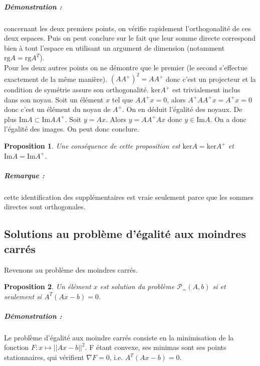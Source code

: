 \documentclass[10pt,a4paper]{article}
\newtheorem{prop}{Proposition}
\begin{document}
\subparagraph{Démonstration :} concernant les deux premiers points, on vérifie rapidement l'orthogonalité de ces deux espaces.
Puis on peut conclure sur le fait que leur somme directe correspond bien à tout l'espace en utilisant un argument de dimension (notamment $\text{rg}A=\text{rg}A^T$).\\
Pour les deux autres points on ne démontre que le premier (le second s'effectue exactement de la même manière). $(AA^+)^2=AA^+$ donc c'est un projecteur et la condition de symétrie assure son orthogonalité. $\text{ker}A^+$ est trivialement inclus dans son noyau.
Soit un élément $x$ tel que $AA^+x=0$, alors $A^+AA^+x=A^+x=0$ donc c'est un élément du noyau de $A^+$.
On en déduit l'égalité des noyaux.
De plus $\text{Im}A \subset \text{Im}AA^+$.
Soit $y=Ax$.
Alors $y=AA^+Ax$ donc $y \in \text{Im}A$.
On a donc l'égalité des images.
On peut donc conclure.
\begin{prop}
Une conséquence de cette proposition est $\text{ker}A=\text{ker}A^+$ et $\text{Im}A=\text{Im}A^+$.
\end{prop}
\subparagraph{Remarque :} cette identification des supplémentaires est vraie seulement parce que les sommes directes sont orthogonales.\\

\subsection{Solutions au problème d'égalité aux moindres carrés}

Revenons au problème des moindres carrés.
\begin{prop}
  Un élément $x$ est solution du problème $\mathcal{P}_{=}(A, b)$ si et seulement si $A^T(Ax-b)=0$.
\end{prop}
\subparagraph{Démonstration :}
Le problème d'égalité aux moindre carrés consiste en la minimisation de la fonction $F: x \mapsto ||Ax - b||^2$.
F étant convexe, ses minimas sont ses points stationnaires, qui vérifient $\nabla F = 0$, i.e. $A^T(Ax - b) = 0$.
\end{document}

